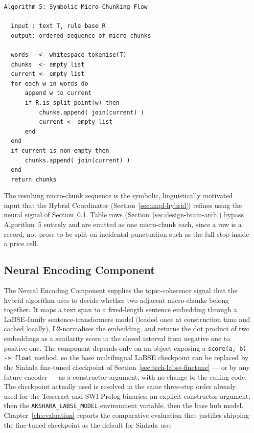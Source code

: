 \documentclass[12pt,a4paper,oneside]{report}
\begin{document}
\begin{verbatim}
Algorithm 5: Symbolic Micro-Chunking Flow

  input : text T, rule base R
  output: ordered sequence of micro-chunks

  words   <- whitespace-tokenise(T)
  chunks  <- empty list
  current <- empty list
  for each w in words do
      append w to current
      if R.is_split_point(w) then
          chunks.append( join(current) )
          current <- empty list
      end
  end
  if current is non-empty then
      chunks.append( join(current) )
  end
  return chunks
\end{verbatim}

The resulting micro-chunk sequence is the symbolic, linguistically motivated input that the Hybrid Coordinator (Section~\ref{sec:impl-hybrid}) refines using the neural signal of Section~\ref{sec:impl-neural}. Table rows (Section~\ref{sec:design-brain-arch}) bypass Algorithm~5 entirely and are emitted as one micro-chunk each, since a row is a record, not prose to be split on incidental punctuation such as the full stop inside a price cell.

\subsection{Neural Encoding Component}
\label{sec:impl-neural}
The Neural Encoding Component supplies the topic-coherence signal that the hybrid algorithm uses to decide whether two adjacent micro-chunks belong together. It maps a text span to a fixed-length sentence embedding through a LaBSE-family sentence-transformers model (loaded once at construction time and cached locally), L2-normalises the embedding, and returns the dot product of two embeddings as a similarity score in the closed interval from negative one to positive one. The component depends only on an object exposing a \texttt{score(a, b) -> float} method, so the base multilingual LaBSE checkpoint can be replaced by the Sinhala fine-tuned checkpoint of Section~\ref{sec:tech-labse-finetune} — or by any future encoder — as a constructor argument, with no change to the calling code. The checkpoint actually used is resolved in the same three-step order already used for the Tesseract and SWI-Prolog binaries: an explicit constructor argument, then the \texttt{AKSHARA\_LABSE\_MODEL} environment variable, then the base hub model. Chapter~\ref{ch:evaluation} reports the comparative evaluation that justifies shipping the fine-tuned checkpoint as the default for Sinhala use.
\end{document}
